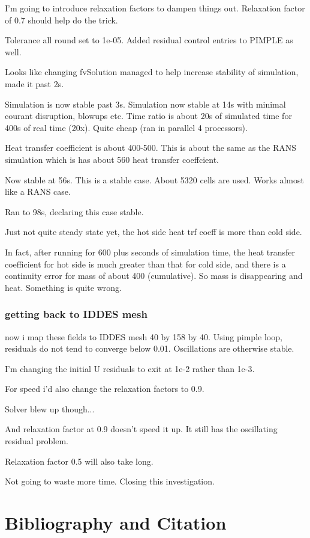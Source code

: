 \documentclass[12pt]{article}
\renewcommand{\_}{\kern-1.5pt\textunderscore\kern-1.5pt}
\begin{document}
I'm going to introduce relaxation factors to dampen things out. 
Relaxation factor of 0.7 should help do the trick.

Tolerance all round set to 1e-05. Added residual control entries to PIMPLE as well.

Looks like changing fvSolution managed to help increase stability of simulation, made it past 2s.

Simulation is now stable past 3s.
Simulation now stable at 14s with minimal courant disruption, blowups etc.
Time ratio is about 20s of simulated time for 400s of real time (20x). Quite cheap (ran in parallel 4 processors). 

Heat transfer coefficient is about 400-500. 
This is about the same as the RANS simulation which is has about 560 heat transfer coeffcient.

Now stable at 56s. This is a stable case.
About 5320 cells are used. Works almost like a RANS case. 

Ran to 98s, declaring this case stable.

Just not quite steady state yet, the hot side heat trf coeff is more than cold side. 

In fact, after running for 600 plus seconds of simulation time, the heat transfer coefficient for hot side is much greater than that for cold side, and there is a continuity error for mass of about 400 (cumulative). So mass is disappearing and heat. Something is quite wrong.


\section{getting back to IDDES mesh}

now i map these fields to IDDES mesh 40 by 158 by 40. Using pimple loop, residuals do not tend to converge below 0.01. Oscillations are otherwise stable.

I'm changing the initial U residuals to exit at 1e-2 rather than 1e-3.

For speed i'd also change the relaxation factors to 0.9. 

Solver blew up though... 

And relaxation factor at 0.9 doesn't speed it up. It still has the oscillating residual problem.

Relaxation factor 0.5 will also take long.

Not going to waste more time. Closing this investigation.


\vspace{\baselineskip}
\part{Bibliography and Citation}

\printbibliography
\end{document}
